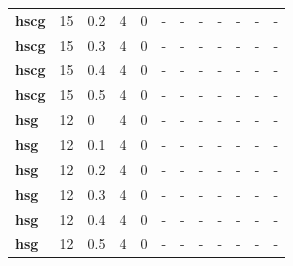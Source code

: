 \begin{longtable}[h]{|p{0.8cm}|p{1.5cm}|p{1cm}|p{1cm}|p{1cm}|p{1cm}|p{1cm}|p{1cm}|p{1cm}|p{1cm}|p{1cm}|p{1.5cm}|}
           \\
  \textbf{hscg} &  15         & 0.2 & 4 & 0 & - & - & - & - & - & - & -
           \\
  \textbf{hscg} &  15         & 0.3 & 4 & 0 & - & - & - & - & - & - & -
           \\
  \textbf{hscg} &  15         & 0.4 & 4 & 0 & - & - & - & - & - & - & -
           \\
  \textbf{hscg} &  15         & 0.5 & 4 & 0 & - & - & - & - & - & - & -
           \\
  \textbf{hsg } &  12         &   0 & 4 & 0 & - & - & - & - & - & - & -
           \\
  \textbf{hsg } &  12         & 0.1 & 4 & 0 & - & - & - & - & - & - & -
           \\
  \textbf{hsg } &  12         & 0.2 & 4 & 0 & - & - & - & - & - & - & -
           \\
  \textbf{hsg } &  12         & 0.3 & 4 & 0 & - & - & - & - & - & - & -
           \\
  \textbf{hsg } &  12         & 0.4 & 4 & 0 & - & - & - & - & - & - & -
           \\
  \textbf{hsg } &  12         & 0.5 & 4 & 0 & - & - & - & - & - & - & -
           \\
 \end{longtable}
